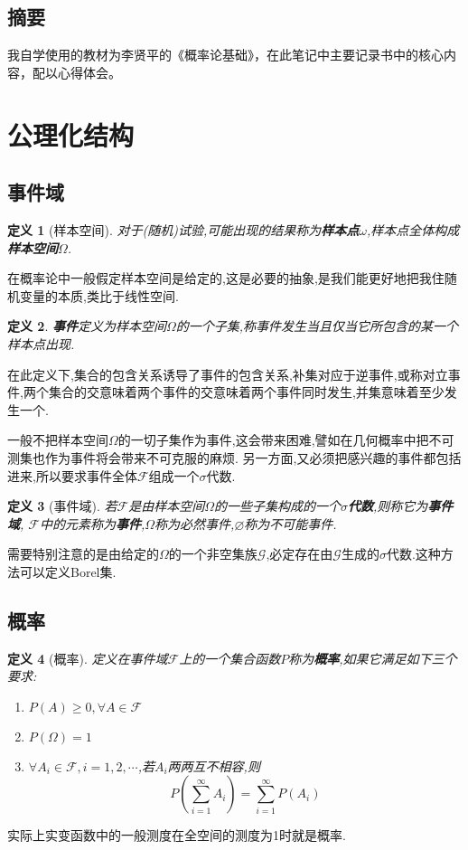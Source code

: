 \documentclass[12pt,a4paper]{article}
\newtheorem{definition}{定义}[subsection] %
\begin{document}
\begin{center}
\section*{摘要}
\end{center}

我自学使用的教材为李贤平的《概率论基础》，在此笔记中主要记录书中的核心内容，配以心得体会。


{\centering\tableofcontents}

\newpage

\section{公理化结构}
\subsection{事件域}
\begin{definition}[样本空间]
    对于(随机)试验,可能出现的结果称为\textbf{样本点}$\omega$,样本点全体构成\textbf{样本空间}$\varOmega$.
\end{definition}
在概率论中一般假定样本空间是给定的,这是必要的抽象,是我们能更好地把我住随机变量的本质,类比于线性空间.
\begin{definition}
    \textbf{事件}定义为样本空间$\varOmega$的一个子集,称事件发生当且仅当它所包含的某一个样本点出现.
\end{definition}
在此定义下,集合的包含关系诱导了事件的包含关系,补集对应于逆事件,或称对立事件,两个集合的交意味着两个事件的交意味着两个事件同时发生,并集意味着至少发生一个.

一般不把样本空间$\varOmega$的一切子集作为事件,这会带来困难,譬如在几何概率中把不可测集也作为事件将会带来不可克服的麻烦.
另一方面,又必须把感兴趣的事件都包括进来,所以要求事件全体$\mathscr{F}$组成一个$\sigma$代数.
\begin{definition}[事件域]
    若$\mathscr{F}$是由样本空间$\varOmega$的一些子集构成的一个\textbf{$\sigma$代数},则称它为\textbf{事件域},
    $\mathscr{F}$中的元素称为\textbf{事件},$\varOmega$称为必然事件,$\varnothing$称为不可能事件.
\end{definition}
需要特别注意的是由给定的$\varOmega$的一个非空集族$\mathscr{G}$,必定存在由$\mathscr{G}$生成的$\sigma$代数.这种方法可以定义Borel集.
\subsection{概率}
\begin{definition}[概率]
    定义在事件域$\mathscr{F}$上的一个集合函数$P$称为\textbf{概率},如果它满足如下三个要求:
    \begin{enumerate}[label=(\roman*),font=\upshape]
        \item $P(A)\geq 0,\forall A \in \mathscr{F}$
        \item $P(\varOmega)=1$
        \item $\forall A_i \in \mathscr{F},i = 1,2, \cdots$,若$A_i$两两互不相容,则
        \[P(\sum_{i=1}^{\infty}A_i) = \sum_{i=1}^{\infty}P(A_i)\]
      \end{enumerate}
\end{definition}
实际上实变函数中的一般测度在全空间的测度为1时就是概率.
\end{document}
